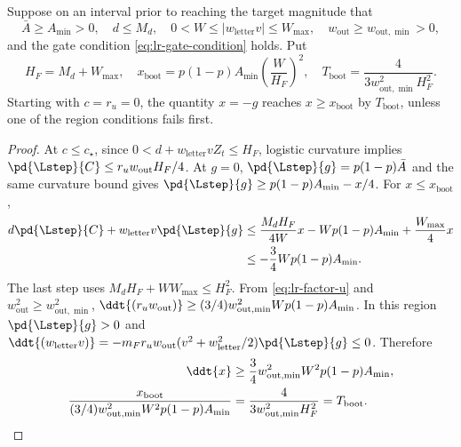 \begin{lemma}
\label{lem:lr-feature-bootstrap}
Suppose on an interval prior to reaching the target magnitude that
\begin{equation}\label{eq:lr-amplification-region}
 \bar A\ge A_{\min}>0,\quad
 d\le M_d,\quad
 0<W\le|{w_{\mathrm{letter}} v}|\le W_{\max},\quad
 w_{\mathrm{out}}\ge w_{\mathrm{out},\min}>0,
\end{equation}
and the gate condition \eqref{eq:lr-gate-condition} holds.  Put
\begin{equation}\label{eq:lr-gamma-bootstrap}
 H_F=M_d+W_{\max},\quad
 x_{\mathrm{boot}}=p(1-p) A_{\min}\left(\frac W{H_F}\right)^2,
 \quad
 T_{\mathrm{boot}}=\frac4{3w_{\mathrm{out},\min}^2H_F^2}.
\end{equation}
Starting with $c=r_u=0$, the quantity $x=-g$ reaches $x\ge x_{\mathrm{boot}}$
by $T_{\mathrm{boot}}$, unless one of the region conditions fails first.
\end{lemma}
\begin{proof}
At $c\le c_\star$, since
$0<d+{w_{\mathrm{letter}} v} Z_t\le H_F$, logistic curvature implies
$\pd{\Lstep}{C}\le{r_uw_{\mathrm{out}}} H_F/4$.  At $g=0$, $\pd{\Lstep}{g}=p(1-p)\bar A$ and the
same curvature bound gives $\pd{\Lstep}{g}\ge p(1-p) A_{\min}-x/4$.
For $x\le x_{\mathrm{boot}}$,
\begin{align*}
 d\pd{\Lstep}{C}+w_{\mathrm{letter}} v\pd{\Lstep}{g}
 &\le\frac{M_dH_F}{4W}x-Wp(1-p)A_{\min}+\frac{W_{\max}}4x\\
 &\le-\frac34Wp(1-p)A_{\min}.
\end{align*}
The last step uses
$M_d H_F+WW_{\max}\le H_F^2$.
From \eqref{eq:lr-factor-u} and
$w_{\mathrm{out}}^2\ge w_{\mathrm{out},\min}^2$,
$\ddt{(r_uw_{\mathrm{out}})}\ge(3/4)w_{\mathrm{out},\min}^2Wp(1-p) A_{\min}$.
In this region $\pd{\Lstep}{g}>0$ and
$\ddt{(w_{\mathrm{letter}} v)}=-m_F{r_uw_{\mathrm{out}}}(v^2+w_{\mathrm{letter}}^2/2)\pd{\Lstep}{g}\le0$.
Therefore
\[
\begin{aligned}
 \ddt{x}&\ge\frac34w_{\mathrm{out},\min}^2W^2p(1-p)A_{\min},\\
 \frac{x_{\mathrm{boot}}}{(3/4)w_{\mathrm{out},\min}^2W^2p(1-p)A_{\min}}
 &=\frac4{3w_{\mathrm{out},\min}^2H_F^2}=T_{\mathrm{boot}}.
\end{aligned}
\]
\end{proof}


